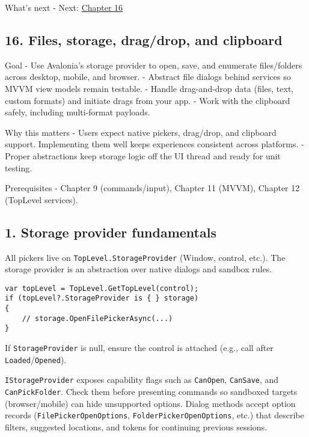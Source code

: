 What's next - Next: \href{Chapter16.md}{Chapter 16}

\newpage

\subsection{16. Files, storage, drag/drop, and
clipboard}\label{files-storage-dragdrop-and-clipboard}

Goal - Use Avalonia's storage provider to open, save, and enumerate
files/folders across desktop, mobile, and browser. - Abstract file
dialogs behind services so MVVM view models remain testable. - Handle
drag-and-drop data (files, text, custom formats) and initiate drags from
your app. - Work with the clipboard safely, including multi-format
payloads.

Why this matters - Users expect native pickers, drag/drop, and clipboard
support. Implementing them well keeps experiences consistent across
platforms. - Proper abstractions keep storage logic off the UI thread
and ready for unit testing.

Prerequisites - Chapter 9 (commands/input), Chapter 11 (MVVM), Chapter
12 (TopLevel services).

\subsection{1. Storage provider
fundamentals}\label{storage-provider-fundamentals}

All pickers live on \passthrough{\lstinline!TopLevel.StorageProvider!}
(Window, control, etc.). The storage provider is an abstraction over
native dialogs and sandbox rules.

\begin{lstlisting}
var topLevel = TopLevel.GetTopLevel(control);
if (topLevel?.StorageProvider is { } storage)
{
    // storage.OpenFilePickerAsync(...)
}
\end{lstlisting}

If \passthrough{\lstinline!StorageProvider!} is null, ensure the control
is attached (e.g., call after
\passthrough{\lstinline!Loaded!}/\passthrough{\lstinline!Opened!}).

\passthrough{\lstinline!IStorageProvider!} exposes capability flags such
as \passthrough{\lstinline!CanOpen!}, \passthrough{\lstinline!CanSave!},
and \passthrough{\lstinline!CanPickFolder!}. Check them before
presenting commands so sandboxed targets (browser/mobile) can hide
unsupported options. Dialog methods accept option records
(\passthrough{\lstinline!FilePickerOpenOptions!},
\passthrough{\lstinline!FolderPickerOpenOptions!}, etc.) that describe
filters, suggested locations, and tokens for continuing previous
sessions.

